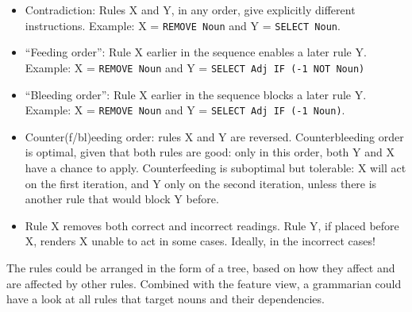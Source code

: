 \documentclass[11pt]{article}
\def\t#1{\texttt{#1}}
\begin{document}
\begin{itemize}
\item Contradiction: Rules X and Y, in any order, give explicitly different instructions. Example: X = \t{REMOVE Noun} and Y = \t{SELECT Noun}.
\item ``Feeding order'': Rule X earlier in the sequence enables a later rule Y. Example: X = \t{REMOVE Noun} and Y = \t{SELECT Adj IF (-1 NOT Noun)}
\item ``Bleeding order'': Rule X earlier in the sequence blocks a later rule Y. Example:  X = \t{REMOVE Noun} and Y = \t{SELECT Adj IF (-1 Noun)}.
\item Counter(f/bl)eeding order: rules X and Y are reversed. Counterbleeding order is optimal, given that both rules are good: only in this order, both Y and X have a chance to apply. Counterfeeding is suboptimal but tolerable: X will act on the first iteration, and Y only on the second iteration, unless there is another rule that would block Y before.
\item Rule X removes both correct and incorrect readings. Rule Y, if placed before X, renders X unable to act in some cases. Ideally, in the incorrect cases!
\end{itemize}

The rules could be arranged in the form of a tree, based on how they affect and are affected by other rules. Combined with the feature view, a grammarian could have a look at all rules that target nouns and their dependencies.













\end{document}
